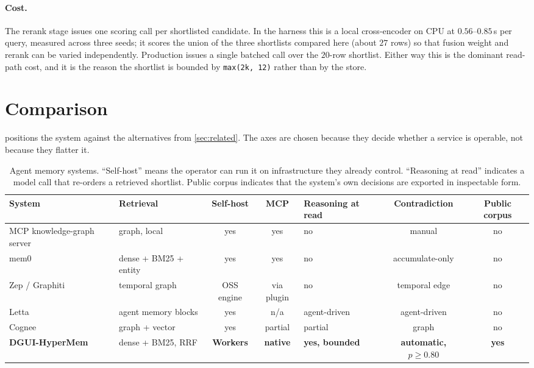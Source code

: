 \documentclass[10pt,twocolumn]{article}
\begin{document}
\paragraph{Cost.}
The rerank stage issues one scoring call per shortlisted candidate. In the
harness this is a local cross-encoder on CPU at $0.56$--$0.85$\,s per query,
measured across three seeds; it scores the union of the three shortlists
compared here (about $27$ rows) so that fusion weight and rerank can be varied
independently. Production issues a single batched call over the $20$-row
shortlist. Either way this is the dominant read-path cost, and it is the reason
the shortlist is bounded by \texttt{max(2k, 12)} rather than by the store.

\section{Comparison}
\label{sec:compare}

 positions the system against the alternatives from
\cref{sec:related}. The axes are chosen because they decide whether a service is
operable, not because they flatter it.

\begin{table}[t]
\caption{Agent memory systems. ``Self-host'' means the operator can run it on
infrastructure they already control. ``Reasoning at read'' indicates a model
call that re-orders a retrieved shortlist. Public corpus indicates that the
system's own decisions are exported in inspectable form.}
\label{tab:compare}
\centering\footnotesize
\setlength{\tabcolsep}{4pt}
\begin{tabular}{@{}
  >{\raggedright\arraybackslash}p{76pt}
  >{\raggedright\arraybackslash}p{58pt}
  c c
  >{\raggedright\arraybackslash}p{62pt}
  c c@{}}
\toprule
System & Retrieval & Self-host & MCP & Reasoning at read & Contradiction & Public corpus \\
\midrule
MCP knowledge-graph server \citep{mcpserver2025} & graph, local & yes & yes & no & manual & no \\
mem0 \citep{chhikara2025mem0} & dense + BM25 + entity & yes & yes & no & accumulate-only & no \\
Zep / Graphiti \citep{zep2025} & temporal graph & OSS engine & via plugin & no & temporal edge & no \\
Letta \citep{letta2025} & agent memory blocks & yes & n/a & agent-driven & agent-driven & no \\
Cognee \citep{cognee2025} & graph + vector & yes & partial & partial & graph & no \\
\midrule
\textbf{DGUI-HyperMem} & dense + BM25, RRF & \textbf{Workers} & \textbf{native} & \textbf{yes, bounded} & \textbf{automatic, $p\geq0.80$} & \textbf{yes} \\
\bottomrule
\end{tabular}
\end{table}
\end{document}
